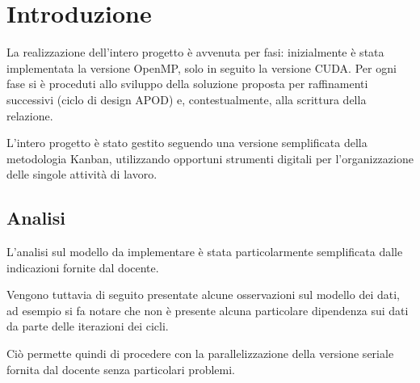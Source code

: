 \section{Introduzione}

La realizzazione dell'intero progetto è avvenuta per fasi: inizialmente è stata
implementata la versione OpenMP, solo in seguito la versione CUDA.
Per ogni fase si è proceduti allo sviluppo della soluzione proposta per
raffinamenti successivi (ciclo di design APOD\cite{nvidiaapod}) e, contestualmente, alla
scrittura della relazione.

L'intero progetto è stato gestito seguendo una versione semplificata della
metodologia Kanban\cite{wiki:kanbandev}, utilizzando opportuni strumenti digitali per
l'organizzazione delle singole attività di lavoro.

\subsection{Analisi}
L'analisi sul modello da implementare è stata particolarmente semplificata dalle
indicazioni fornite dal docente.

Vengono tuttavia di seguito presentate alcune osservazioni sul modello dei dati,
ad esempio si fa notare che non è presente alcuna particolare dipendenza sui
dati da parte delle iterazioni dei cicli.

Ciò permette quindi di procedere con la parallelizzazione della versione seriale
fornita dal docente senza particolari problemi.
